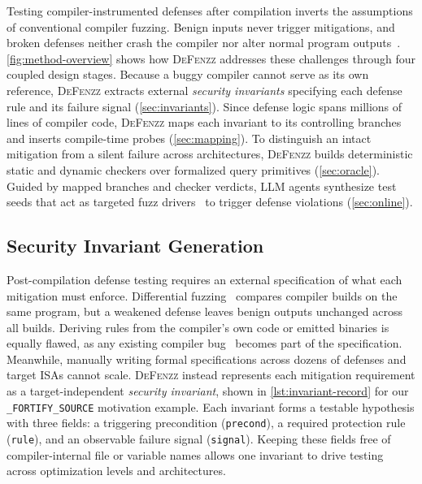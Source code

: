 \documentclass[conference,compsoc]{IEEEtran}
\begin{document}
Testing compiler-instrumented defenses after compilation inverts the assumptions of conventional compiler fuzzing. Benign inputs never trigger mitigations, and broken defenses neither crash the compiler nor alter normal program outputs~\cite{simon2018whatyouc,silentbugs2023}. \autoref{fig:method-overview} shows how \textsc{DeFenzz} addresses these challenges through four coupled design stages. Because a buggy compiler cannot serve as its own reference, \textsc{DeFenzz} extracts external \emph{security invariants} specifying each defense rule and its failure signal (\autoref{sec:invariants}). Since defense logic spans millions of lines of compiler code, \textsc{DeFenzz} maps each invariant to its controlling branches and inserts compile-time probes (\autoref{sec:mapping}). To distinguish an intact mitigation from a silent failure across architectures, \textsc{DeFenzz} builds deterministic static and dynamic checkers over formalized query primitives (\autoref{sec:oracle}). Guided by mapped branches and checker verdicts, LLM agents synthesize test seeds that act as targeted fuzz drivers~\cite{lyu2024promptfuzz} to trigger defense violations (\autoref{sec:online}).

\subsection{Security Invariant Generation}\label{sec:invariants}\label{sec:specgen}

Post-compilation defense testing requires an external specification of what each mitigation must enforce. Differential fuzzing~\cite{yang2011csmith,le2014emi,livinskii2020yarpgen} compares compiler builds on the same program, but a weakened defense leaves benign outputs unchanged across all builds. Deriving rules from the compiler's own code or emitted binaries is equally flawed, as any existing compiler bug~\cite{wang2013stack,yang2017deadstore} becomes part of the specification. Meanwhile, manually writing formal specifications across dozens of defenses and target ISAs cannot scale. \textsc{DeFenzz} instead represents each mitigation requirement as a target-independent \emph{security invariant}, shown in \autoref{lst:invariant-record} for our \texttt{\_FORTIFY\_SOURCE} motivation example. Each invariant forms a testable hypothesis with three fields: a triggering precondition (\texttt{precond}), a required protection rule (\texttt{rule}), and an observable failure signal (\texttt{signal}). Keeping these fields free of compiler-internal file or variable names allows one invariant to drive testing across optimization levels and architectures.
\end{document}
